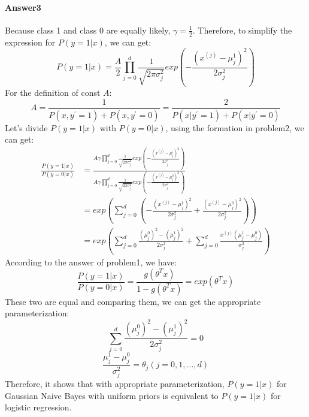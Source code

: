 \documentclass[paper=a4, fontsize=11pt]{scrartcl} %
\numberwithin{equation}{section} %
\numberwithin{figure}{section} %
\numberwithin{table}{section} %
\begin{document}
\paragraph{\textbf{Answer3}}
Because class 1 and class 0 are equally likely, $\gamma=\frac{1}{2}$. Therefore, to simplify the expression for $P\left ( y=1|x \right )$, we can get:
\begin{equation*}
P\left ( y=1|x \right )=\frac{A}{2}\prod_{j=0}^{d}\frac{1}{\sqrt{2\pi \sigma _{j}^{2}}}exp\left ( -\frac{\left ( x^{\left ( j \right )}-\mu _{j}^{1} \right )^{2}}{2\sigma _{j}^{2}} \right )
\end{equation*}
For the definition of const $A$:
\begin{equation*}
A =\frac{1}{P\left ( x,y^{'}=1 \right ) +P\left ( x,y^{'}=0 \right )}=\frac{2}{P\left ( x|y^{'}=1 \right ) +P\left ( x|y^{'}=0 \right )}
\end{equation*}
Let's divide $P\left ( y=1|x \right )$ with $P\left ( y=0|x \right )$, using the formation in problem2, we can get:
\begin{align*}
\frac{P\left ( y=1|x \right )}{P\left ( y=0|x \right )}
&= \frac{A \gamma\prod_{j=0}^{d}\frac{1}{\sqrt{2\pi \sigma _{j}^{2}}}exp\left ( -\frac{\left ( x^{\left ( j \right )}-\mu _{j}^{1} \right )^{2}}{2\sigma _{j}^{2}} \right )}{A \gamma\prod_{j=0}^{d}\frac{1}{\sqrt{2\pi \sigma _{j}^{2}}}exp\left ( -\frac{\left ( x^{\left ( j \right )}-\mu _{j}^{0} \right )^{2}}{2\sigma _{j}^{2}} \right )}
\\&= exp\left ( \sum_{j=0}^{d} \left (  -\frac{\left ( x^{\left ( j \right )}-\mu _{j}^{1} \right )^{2}}{2\sigma _{j}^{2}} +\frac{\left ( x^{\left ( j \right )}-\mu _{j}^{0} \right )^{2}}{2\sigma _{j}^{2}} \right )\right )
\\&= exp\left ( \sum_{j=0}^{d}\frac{\left ( \mu _{j}^{0} \right )^{2}-\left ( \mu _{j}^{1} \right )^{2}}{2\sigma _{j}^{2}}+\sum_{j=0}^{d}\frac{x^{\left ( j \right )}\left ( \mu _{j}^{1}-\mu_{j}^{0} \right )}{\sigma _{j}^{2}} \right )
\end{align*}
According to the answer of problem1, we have:
\begin{equation*}
\frac{P\left ( y=1|x \right )}{P\left ( y=0|x \right )}=\frac{g\left ( \theta ^{T}x \right )}{1-g\left ( \theta ^{T}x \right )}=exp\left ( \theta ^{T}x \right )
\end{equation*}
These two are equal and comparing them, we can get the appropriate parameterization:
\begin{equation*}
\sum_{j=0}^{d}\frac{\left ( \mu _{j}^{0} \right )^{2}-\left ( \mu _{j}^{1} \right )^{2}}{2\sigma _{j}^{2}}=0
\end{equation*}
\begin{equation*}
\frac{\mu _{j}^{1}-\mu_{j}^{0} }{\sigma _{j}^{2}}=\theta _{j}\left ( j=0,1,...,d \right )
\end{equation*}
Therefore, it shows that with appropriate parameterization, $P\left ( y=1|x \right )$ for Gaussian Naive Bayes with uniform priors is equivalent to $P\left ( y=1|x \right )$ for logistic regression.
\end{document}
